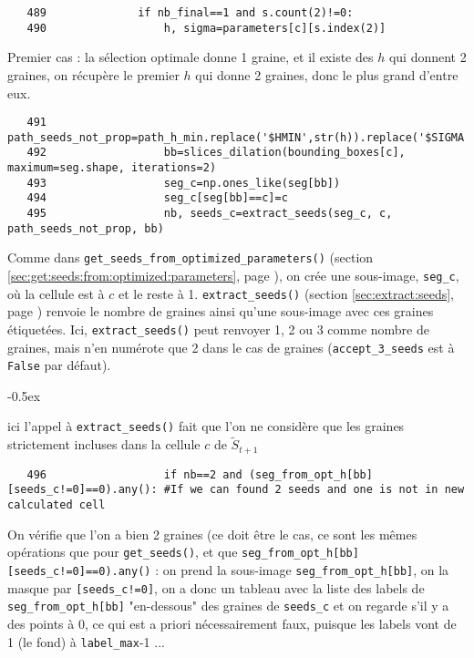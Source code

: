 \documentclass{article}
\def \mycolor {red}
\begin{document}
\color{black}
\begin{verbatim} 
   489	            if nb_final==1 and s.count(2)!=0:
   490	                h, sigma=parameters[c][s.index(2)]
\end{verbatim} 
\color{\mycolor}
Premier cas : la s\'election optimale donne 1 graine, et il existe des $h$ qui donnent 2 graines, on r\'ecup\`ere le premier $h$ qui donne 2 graines, donc le plus grand d'entre eux.
\color{black}
\begin{verbatim} 
   491	                path_seeds_not_prop=path_h_min.replace('$HMIN',str(h)).replace('$SIGMA',str(sigma));
   492	                bb=slices_dilation(bounding_boxes[c], maximum=seg.shape, iterations=2)
   493	                seg_c=np.ones_like(seg[bb])
   494	                seg_c[seg[bb]==c]=c
   495	                nb, seeds_c=extract_seeds(seg_c, c, path_seeds_not_prop, bb)
\end{verbatim} 
\color{\mycolor}
Comme dans \texttt{get\_seeds\_from\_optimized\_parameters()} (section \ref{sec:get:seeds:from:optimized:parameters}, page \pageref{sec:get:seeds:from:optimized:parameters}), on cr\'ee une sous-image, \verb|seg_c|, o\`u la cellule est \`a $c$ et le reste \`a 1.
\texttt{extract\_seeds()} (section \ref{sec:extract:seeds}, page \pageref{sec:extract:seeds}) renvoie le nombre de graines ainsi qu'une sous-image avec ces graines \'etiquet\'ees. Ici, \texttt{extract\_seeds()} peut renvoyer 1, 2 ou 3 comme nombre de graines, mais n'en num\'erote que 2 dans le cas de graines (\texttt{accept\_3\_seeds} est \`a \texttt{False} par d\'efaut).
\begin{description}
\itemsep -0.5ex
\item[ATTENTION :] ici l'appel \`a \verb|extract_seeds()| fait que l'on ne consid\`ere que les graines strictement incluses dans la cellule $c$ de $\tilde{S}_{t+1}$
\end{description}
\color{black}
\begin{verbatim} 
   496	                if nb==2 and (seg_from_opt_h[bb][seeds_c!=0]==0).any(): #If we can found 2 seeds and one is not in new calculated cell
\end{verbatim} 
\color{\mycolor}
On v\'erifie que l'on a bien 2 graines (ce doit \^etre le cas, ce sont les m\^emes op\'erations que pour \texttt{get\_seeds()}, et que \verb|seg_from_opt_h[bb][seeds_c!=0]==0).any()| : on prend la sous-image \verb|seg_from_opt_h[bb]|, on la masque par \verb|[seeds_c!=0]|, on a donc un tableau avec la liste des labels de  \verb|seg_from_opt_h[bb]| "en-dessous" des graines de \verb|seeds_c| et on regarde s'il y a des points \`a 0, ce qui est a priori n\'ecessairement faux, puisque les labels vont de 1 (le fond) \`a \verb|label_max|-1 ...
\end{document}
